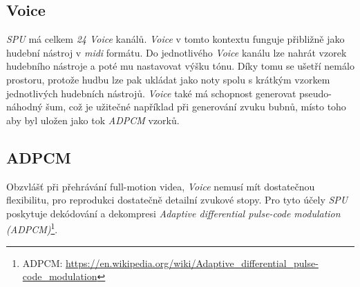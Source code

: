 \subsection{Voice}

\textit{SPU} má celkem \textit{24 Voice} kanálů.
\textit{Voice} v tomto kontextu funguje přibližně jako hudební nástroj v \textit{midi} formátu. Do jednotlivého \textit{Voice} kanálu
lze nahrát vzorek hudebního nástroje a poté mu nastavovat výšku tónu. Díky tomu se ušetří
nemálo prostoru, protože hudbu lze pak ukládat jako noty spolu s krátkým vzorkem jednotlivých hudebních nástrojů.
\textit{Voice} také má schopnost generovat pseudo-náhodný šum, což je užitečné například při generování zvuku bubnů, místo toho aby
byl uložen jako tok \textit{ADPCM} vzorků.

\subsection{ADPCM}

Obzvlášť při přehrávání full-motion videa, \textit{Voice} nemusí mít dostatečnou flexibilitu, pro reprodukci
dostatečně detailní zvukové stopy. Pro tyto účely \textit{SPU} poskytuje dekódování a dekompresi \textit{Adaptive differential pulse-code modulation (ADPCM)}\footnote{ADPCM: \url{https://en.wikipedia.org/wiki/Adaptive_differential_pulse-code_modulation}}.